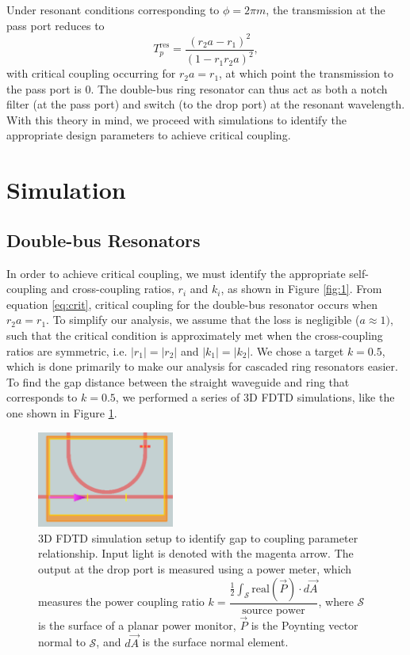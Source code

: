 \documentclass[letterpaper, 10 pt, conference]{ieeeconf}
\begin{document}
Under resonant conditions corresponding to $\phi = 2\pi m$, the transmission at the pass port reduces to 
\begin{equation}
    T_p^{\text{res}} = \dfrac{(r_2a-r_1)^2}{(1-r_1r_2a)^2},
    \label{eq:crit}
\end{equation}
with critical coupling occurring for $r_2a=r_1$, at which point the transmission to the pass port is $0$. The double-bus ring resonator can thus act as both a notch filter (at the pass port) and switch (to the drop port) at the resonant wavelength. With this theory in mind, we proceed with simulations to identify the appropriate design parameters to achieve critical coupling.


\section{Simulation}
\subsection*{Double-bus Resonators}
In order to achieve critical coupling, we must identify the appropriate self-coupling and cross-coupling ratios, $r_i$ and $k_i$, as shown in Figure \ref{fig:1}. From equation \eqref{eq:crit}, critical coupling for the double-bus resonator occurs when $r_2a = r_1$. To simplify our analysis, we assume that the loss is negligible ($a\approx 1)$, such that the critical condition is approximately met when the cross-coupling ratios are symmetric, i.e. $|r_1| = |r_2|$ and $|k_1| = |k_2|$. We chose a target $k=0.5$, which is done primarily to make our analysis for cascaded ring resonators easier. To find the gap distance between the straight waveguide and ring that corresponds to $k=0.5$, we performed a series of 3D FDTD simulations, like the one shown in Figure \ref{fig:sim3d}.

\begin{figure}[!ht]
    \centering
    \includegraphics[width = 0.4\textwidth]{gapdist.png}
    \caption{3D FDTD simulation setup to identify gap to coupling parameter relationship. Input light is denoted with the magenta arrow. The output at the drop port is measured using a power meter, which measures the power coupling ratio $k =\dfrac{\frac{1}{2}\int_\mathcal{S}\text{real}(\vec{P})\cdot d\vec{A}}{\text{source power}}$, where $\mathcal{S}$ is the surface of a planar power monitor, $\vec{P}$ is the Poynting vector normal to $\mathcal{S}$, and $d\vec{A}$ is the surface normal element. }
    \label{fig:sim3d}
\end{figure} 
\end{document}
